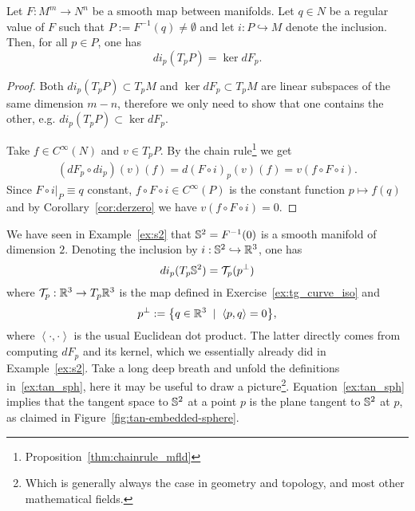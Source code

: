 \begin{proposition}
  Let $F:M^m\to N^n$ be a smooth map between manifolds.
  Let $q\in N$ be a regular value of $F$ such that $P:=F^{-1}(q)\neq\emptyset$ and let $i:P\hookrightarrow M$ denote the inclusion.
  Then, for all $p\in P$, one has
  \begin{equation}
    d i_p(T_p P) = \ker dF_p.
  \end{equation}
\end{proposition}
\begin{proof}
  Both $d i_p(T_p P)\subset T_p M$ and $\ker dF_p \subset T_p M$ are linear subspaces of the same dimension $m-n$, therefore we only need to show that one contains the other, e.g. $d i_p(T_p P) \subset \ker dF_p$.

  Take $f\in C^\infty(N)$ and $v\in T_p P$. By the chain rule\footnote{Proposition~\ref{thm:chainrule_mfld}} we get
  \begin{align}
    (d F_p \circ d i_p)(v)(f) = d(F\circ i)_p(v)(f) = v(f\circ F\circ i).
  \end{align}
  Since $F\circ i\big|_{P} \equiv q$ constant, $f\circ F\circ i\in C^\infty(P)$ is the constant function $p \mapsto f(q)$ and by Corollary~\ref{cor:derzero} we have $v(f\circ F\circ i)=0$.
\end{proof}

\begin{example}
  We have seen in Example~\ref{ex:s2} that $\mathbb{S}^2 = F^{-1}(0)$ is a smooth manifold of dimension $2$.
  Denoting the inclusion by $i:\mathbb{S}^2 \hookrightarrow\mathbb{R}^3$, one has
  \begin{equation}\label{ex:tan_sph}
    di_p(T_p\mathbb{S}^2) = \mathcal{T}_p(p^\perp)
  \end{equation}
  where $\mathcal{T}_p:\mathbb{R}^3\to T_p\mathbb{R}^3$ is the map defined in Exercise~\ref{ex:tg_curve_iso} and
  \begin{equation}
    p^\perp := \big\{q\in\mathbb{R}^3 \;\mid\; \left\langle p, q\right\rangle = 0\big\},
  \end{equation}
  where $\left\langle\cdot,\cdot\right\rangle$ is the usual Euclidean dot product. The latter directly comes from computing $dF_p$ and its kernel, which we essentially already did in Example~\ref{ex:s2}.
  Take a long deep breath and unfold the definitions in~\eqref{ex:tan_sph}, here it may be useful to draw a picture\footnote{Which is generally always the case in geometry and topology, and most other mathematical fields.}. 
  Equation~\eqref{ex:tan_sph} implies that the tangent space to $\mathbb{S}^2$ at a point $p$ is the plane tangent to $\mathbb{S}^2$ at $p$, as claimed in Figure~\ref{fig:tan-embedded-sphere}.
\end{example}

